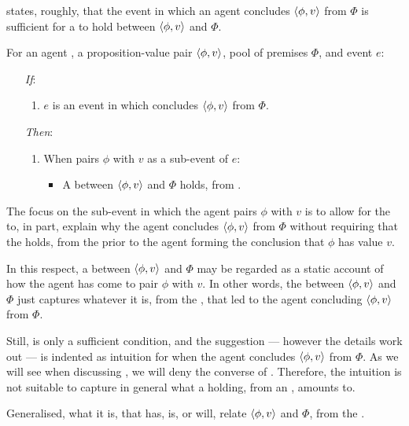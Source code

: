 \begin{note}
  \supportI{} states, roughly, that the event in which an agent concludes \(\langle \phi, v \rangle\) from \(\Phi\) is sufficient for a \ros{} to hold between \(\langle \phi, v \rangle\) and \(\Phi\).

  \begin{idea}[\supportI{}]
    \label{idea:support}
    For an agent \vAgent{}, a proposition-value pair \(\langle \phi, v \rangle\), pool of premises \(\Phi\), and event \(e\):

    \begin{itemize}
    \item[\emph{If}:]
      \begin{enumerate}[label=\alph*., ref=(\alph*)]
      \item
        \(e\) is an event in which \vAgent{} concludes \(\langle \phi, v \rangle\) from \(\Phi\).
      \end{enumerate}
    \item[\emph{Then}:]
      \begin{enumerate}[label=\alph*., ref=(\alph*), resume]
      \item
        When \vAgent{} pairs \(\phi\) with \(v\) as a sub-event of \(e\):
        \begin{itemize}
        \item
          A \emph{\ros{}} between \(\langle \phi, v \rangle\) and \(\Phi\) holds, from .
        \end{itemize}
      \end{enumerate}
    \end{itemize}
    \vspace{-\baselineskip}
  \end{idea}

  The focus on the sub-event in which the agent pairs \(\phi\) with \(v\) is to allow for the \ros{} to, in part, explain why the agent concludes \(\langle \phi, v \rangle\) from \(\Phi\) without requiring that the \ros{} holds, from the \agpe{} prior to the agent forming the conclusion that \(\phi\) has value \(v\).

  In this respect, a \ros{} between \(\langle \phi, v \rangle\) and \(\Phi\) may be regarded as a static account of how the agent has come to pair \(\phi\) with \(v\).
  In other words, the \ros{} between \(\langle \phi, v \rangle\) and \(\Phi\) just captures whatever it is, from the \agpe{}, that led to the agent concluding \(\langle \phi, v \rangle\) from \(\Phi\).

  Still, \supportI{} is only a sufficient condition, and the suggestion --- however the details work out --- is indented as intuition for when the agent concludes \(\langle \phi, v \rangle\) from \(\Phi\).
  As we will see when discussing \supportII{}, we will deny the converse of \supportI{}.
  Therefore, the intuition is not suitable to capture in general what a \ros{} holding, from an \agpe{}, amounts to.

  Generalised, what it is, that has, is, or will, relate \(\langle \phi, v \rangle\) and \(\Phi\), from the \agpe{}.
\end{note}


